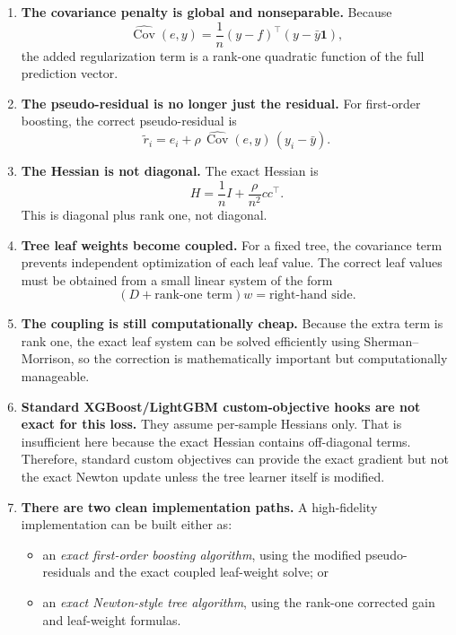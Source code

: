 \documentclass[11pt]{article}
\newcommand{\1}{\mathbf{1}}
\newcommand{\Cov}{\operatorname{Cov}}
\begin{document}
\begin{enumerate}[leftmargin=2em]
\item \textbf{The covariance penalty is global and nonseparable.}
Because
\[
\widehat{\Cov}(e,y) = \frac{1}{n}(y-f)^\top (y-\bar y\1),
\]
the added regularization term is a rank-one quadratic function of the full prediction vector.

\item \textbf{The pseudo-residual is no longer just the residual.}
For first-order boosting, the correct pseudo-residual is
\[
\widetilde r_i = e_i + \rho\,\widehat{\Cov}(e,y)\,(y_i-\bar y).
\]

\item \textbf{The Hessian is not diagonal.}
The exact Hessian is
\[
H = \frac{1}{n}I + \frac{\rho}{n^2}cc^\top.
\]
This is diagonal plus rank one, not diagonal.

\item \textbf{Tree leaf weights become coupled.}
For a fixed tree, the covariance term prevents independent optimization of each leaf value. The correct leaf values must be obtained from a small linear system of the form
\[
(D + \text{rank-one term})w = \text{right-hand side}.
\]

\item \textbf{The coupling is still computationally cheap.}
Because the extra term is rank one, the exact leaf system can be solved efficiently using Sherman--Morrison, so the correction is mathematically important but computationally manageable.

\item \textbf{Standard XGBoost/LightGBM custom-objective hooks are not exact for this loss.}
They assume per-sample Hessians only. That is insufficient here because the exact Hessian contains off-diagonal terms. Therefore, standard custom objectives can provide the exact gradient but not the exact Newton update unless the tree learner itself is modified.

\item \textbf{There are two clean implementation paths.}
A high-fidelity implementation can be built either as:
\begin{itemize}[leftmargin=2em]
\item an \emph{exact first-order boosting algorithm}, using the modified pseudo-residuals and the exact coupled leaf-weight solve; or
\item an \emph{exact Newton-style tree algorithm}, using the rank-one corrected gain and leaf-weight formulas.
\end{itemize}
\end{enumerate}
\end{document}

